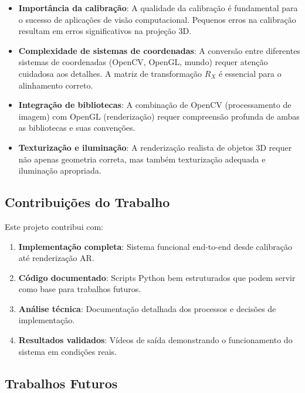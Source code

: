 \begin{itemize}
    \item \textbf{Importância da calibração}: A qualidade da calibração é fundamental para o sucesso de aplicações de visão computacional. Pequenos erros na calibração resultam em erros significativos na projeção 3D.
    
    \item \textbf{Complexidade de sistemas de coordenadas}: A conversão entre diferentes sistemas de coordenadas (OpenCV, OpenGL, mundo) requer atenção cuidadosa aos detalhes. A matriz de transformação $R_X$ é essencial para o alinhamento correto.
    
    \item \textbf{Integração de bibliotecas}: A combinação de OpenCV (processamento de imagem) com OpenGL (renderização) requer compreensão profunda de ambas as bibliotecas e suas convenções.
    
    \item \textbf{Texturização e iluminação}: A renderização realista de objetos 3D requer não apenas geometria correta, mas também texturização adequada e iluminação apropriada.
\end{itemize}

\subsection{Contribuições do Trabalho}

Este projeto contribui com:

\begin{enumerate}
    \item \textbf{Implementação completa}: Sistema funcional end-to-end desde calibração até renderização AR.
    
    \item \textbf{Código documentado}: Scripts Python bem estruturados que podem servir como base para trabalhos futuros.
    
    \item \textbf{Análise técnica}: Documentação detalhada dos processos e decisões de implementação.
    
    \item \textbf{Resultados validados}: Vídeos de saída demonstrando o funcionamento do sistema em condições reais.
\end{enumerate}

\subsection{Trabalhos Futuros}

